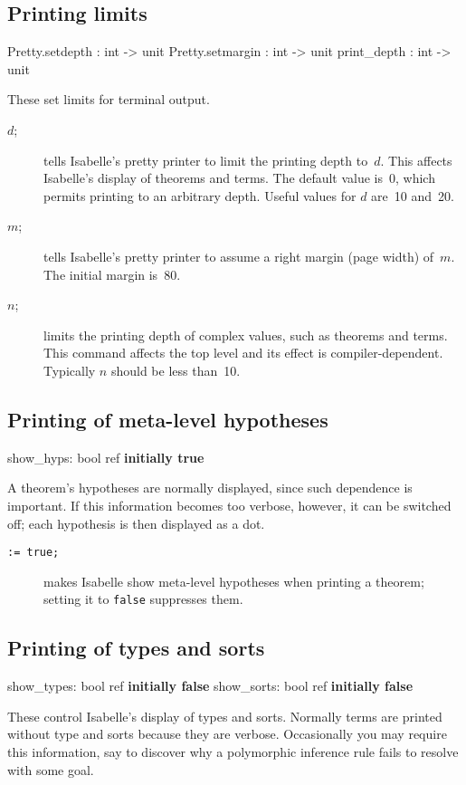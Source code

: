 \subsection{Printing limits}
\begin{ttbox} 
Pretty.setdepth  : int -> unit
Pretty.setmargin : int -> unit
print_depth      : int -> unit
\end{ttbox}
These set limits for terminal output.

\begin{description}
\item[ \(d\);]  tells
Isabelle's pretty printer to limit the printing depth to~$d$.  This affects
Isabelle's display of theorems and terms.  The default value is~0, which
permits printing to an arbitrary depth.  Useful values for $d$ are~10 and~20.

\item[ \(m\);]  tells
Isabelle's pretty printer to assume a right margin (page width) of~$m$.
The initial margin is~80.

\item[ \(n\);]  limits
the printing depth of complex \ML{} values, such as theorems and terms.
This command affects the \ML{} top level and its effect is
compiler-dependent.  Typically $n$ should be less than~10.
\end{description}


\subsection{Printing of meta-level hypotheses}
\begin{ttbox} 
show_hyps: bool ref \hfill{\bf initially true}
\end{ttbox}
A theorem's hypotheses are normally displayed, since such dependence is
important.  If this information becomes too verbose, however, it can be
switched off;  each hypothesis is then displayed as a dot.
\begin{description}
\item[ \tt:= true;]   
makes Isabelle show meta-level hypotheses when printing a theorem; setting
it to {\tt false} suppresses them.
\end{description}


\subsection{Printing of types and sorts}
\begin{ttbox} 
show_types: bool ref \hfill{\bf initially false}
show_sorts: bool ref \hfill{\bf initially false}
\end{ttbox}
These control Isabelle's display of types and sorts.  Normally terms are
printed without type and sorts because they are verbose.  Occasionally you
may require this information, say to discover why a polymorphic inference rule
fails to resolve with some goal.

